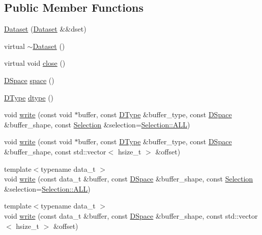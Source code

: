 \subsection*{Public Member Functions}
\begin{DoxyCompactItemize}
\item 
\hyperlink{class_h5_t_l_1_1_dataset_a0dbc91a3302c8affed45970aeb3cdd88}{Dataset} (\hyperlink{class_h5_t_l_1_1_dataset}{Dataset} \&\&dset)
\item 
virtual \hyperlink{class_h5_t_l_1_1_dataset_a918b06db14171308441b89b701d827ba}{$\sim$\-Dataset} ()
\item 
virtual void \hyperlink{class_h5_t_l_1_1_dataset_a870b88885b1edd806edcc15cc4a68b89}{close} ()
\item 
\hyperlink{class_h5_t_l_1_1_d_space}{D\-Space} \hyperlink{class_h5_t_l_1_1_dataset_a3b0cc1434d993029fcbff1998767e0c3}{space} ()
\item 
\hyperlink{class_h5_t_l_1_1_d_type}{D\-Type} \hyperlink{class_h5_t_l_1_1_dataset_a3ac128ce40c50aaf352c70c96c853748}{dtype} ()
\item 
void \hyperlink{class_h5_t_l_1_1_dataset_aebd58da33d992bb608067c85c944e688}{write} (const void $\ast$buffer, const \hyperlink{class_h5_t_l_1_1_d_type}{D\-Type} \&buffer\-\_\-type, const \hyperlink{class_h5_t_l_1_1_d_space}{D\-Space} \&buffer\-\_\-shape, const \hyperlink{class_h5_t_l_1_1_selection}{Selection} \&selection=\hyperlink{class_h5_t_l_1_1_selection_a32d830ebff3c607e0425fa5d6ef72df0}{Selection\-::\-A\-L\-L})
\item 
void \hyperlink{class_h5_t_l_1_1_dataset_a5eff3aaf3ac89c159cd8182400947b50}{write} (const void $\ast$buffer, const \hyperlink{class_h5_t_l_1_1_d_type}{D\-Type} \&buffer\-\_\-type, const \hyperlink{class_h5_t_l_1_1_d_space}{D\-Space} \&buffer\-\_\-shape, const std\-::vector$<$ hsize\-\_\-t $>$ \&offset)
\item 
{\footnotesize template$<$typename data\-\_\-t $>$ }\\void \hyperlink{class_h5_t_l_1_1_dataset_aec3ddf07a6b592c8e7f8b44e7fd35375}{write} (const data\-\_\-t \&buffer, const \hyperlink{class_h5_t_l_1_1_d_space}{D\-Space} \&buffer\-\_\-shape, const \hyperlink{class_h5_t_l_1_1_selection}{Selection} \&selection=\hyperlink{class_h5_t_l_1_1_selection_a32d830ebff3c607e0425fa5d6ef72df0}{Selection\-::\-A\-L\-L})
\item 
{\footnotesize template$<$typename data\-\_\-t $>$ }\\void \hyperlink{class_h5_t_l_1_1_dataset_a077d5bb62ed4b99db4900ae2af64cb7b}{write} (const data\-\_\-t \&buffer, const \hyperlink{class_h5_t_l_1_1_d_space}{D\-Space} \&buffer\-\_\-shape, const std\-::vector$<$ hsize\-\_\-t $>$ \&offset)

\end{DoxyCompactItemize}
